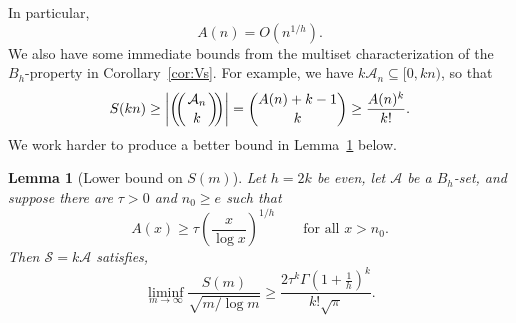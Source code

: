 \documentclass[10pt,letterpaper]{article}
\newcommand{\cA}{\mathcal{A}}
\newcommand{\cS}{\mathcal{S}}
\DeclarePairedDelimiter{\abs}{\lvert}{\rvert}
\newcommand{\multibinom}[2]{\left(\kern-0.3em\left(\genfrac{}{}{0pt}{}{#1}{#2}\right)\kern-0.3em\right)}
\newtheorem{lem}[thm]{Lemma}
\theoremstyle{remark}
\begin{document}
In particular,
  \[ A(n) = O(n^{1/h}).\]
We also have some immediate bounds from the multiset characterization of the $B_h$-property in Corollary~\ref{cor:Vs}. For example, we have $k\cA_n \subseteq[0,kn)$, so that
  \begin{equation}\label{eq:S(kn) > A(n)^k / k!}
    S(kn) \ge \abs*{\multibinom{\cA_n}{k}} = \binom{A(n)+k-1}{k} \ge \frac{A(n)^k}{k!}.
  \end{equation}
We work harder to produce a better bound in Lemma~\ref{lem:simplex} below.
\begin{lem}[Lower bound on $S(m)$]\label{lem:simplex}
Let $h=2k$ be even, let $\cA$ be a $B_h$-set, and suppose there are $\tau>0$
and $n_0\ge e$ such that
  \[A(x) \ge \tau\left(\frac{x}{\log x}\right)^{1/h}
    \qquad\text{for all } x> n_0.\]
Then $\cS=k\cA$ satisfies,
  \[\liminf_{m\to\infty} \frac{S(m)}{\sqrt{m/\log m}} \ge \frac{2\tau^k \Gamma(1+\tfrac1h)^k}{k!\sqrt{\pi}}.\]
\end{lem}
 
\end{document}
